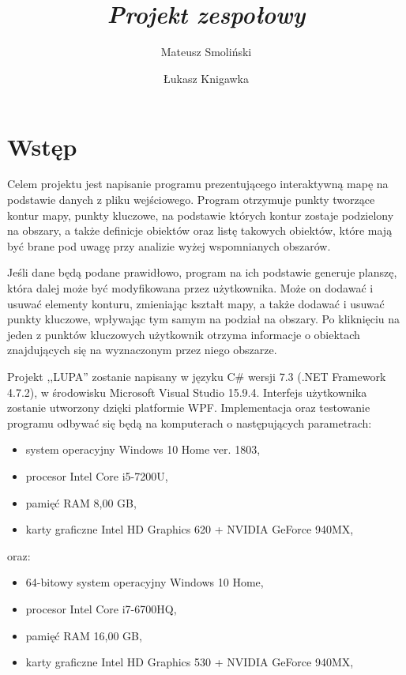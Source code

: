 \documentclass[a4paper,11pt]{article}
\title{ \sc{Specyfikacja implementacyjna} \\
\emph{Projekt zespołowy} }
\author{Mateusz Smoliński \and Łukasz Knigawka}
\newcommand\tab[1][0.6cm]{\hspace*{#1}}
\begin{document}
\maketitle

\thispagestyle{empty}

\tableofcontents

\newpage

\section{Wstęp}

\tab Celem projektu jest napisanie programu prezentującego interaktywną mapę na podstawie danych z pliku wejściowego. Program otrzymuje punkty tworzące kontur mapy, punkty kluczowe, na podstawie których kontur zostaje podzielony na obszary, a także definicje obiektów oraz listę takowych obiektów, które mają być brane pod uwagę przy analizie wyżej wspomnianych obszarów.

Jeśli dane będą podane prawidłowo, program na ich podstawie generuje planszę, która dalej może być modyfikowana przez użytkownika. Może on dodawać i usuwać elementy konturu, zmieniając kształt mapy, a także dodawać i usuwać punkty kluczowe, wpływając tym samym na podział na obszary. Po kliknięciu na jeden z punktów kluczowych użytkownik otrzyma informacje o obiektach znajdujących się na wyznaczonym przez niego obszarze.

Projekt ,,LUPA'' zostanie napisany w języku C\# wersji 7.3 (.NET Framework 4.7.2), w środowisku Microsoft Visual Studio 15.9.4. Interfejs użytkownika zostanie utworzony dzięki platformie WPF. Implementacja oraz testowanie programu odbywać się będą na komputerach o następujących parametrach: 
\begin{itemize}

\item system operacyjny Windows 10 Home ver. 1803,
\item procesor Intel Core i5-7200U,
\item pamięć RAM 8,00 GB,
\item karty graficzne Intel HD Graphics 620 + NVIDIA GeForce 940MX,

\end{itemize}

oraz:

\begin{itemize}

\item 64-bitowy system operacyjny Windows 10 Home,
\item procesor Intel Core i7-6700HQ,
\item pamięć RAM 16,00 GB,
\item karty graficzne Intel HD Graphics 530 + NVIDIA GeForce 940MX,

\end{itemize}
\end{document}
